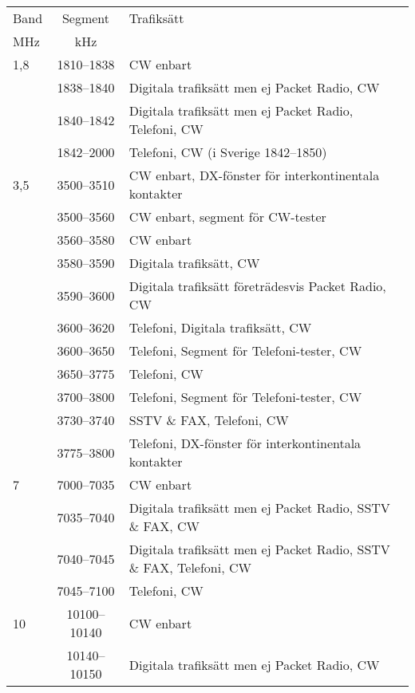 \setlongtables
\begin{longtable}{lcl}
Band & Segment & Trafiksätt \\
MHz  & kHz     & \\ \hline
\endhead

1,8  & 1810--1838 & CW enbart \\
     & 1838--1840 & Digitala trafiksätt men ej Packet Radio, CW \\
     & 1840--1842 & Digitala trafiksätt men ej Packet Radio, Telefoni, CW \\
     & 1842--2000 & Telefoni, CW (i Sverige 1842--1850) \\

3,5  & 3500--3510 & CW enbart, DX-fönster för interkontinentala kontakter \\
     & 3500--3560 & CW enbart, segment för CW-tester \\
     & 3560--3580 & CW enbart \\
     & 3580--3590 & Digitala trafiksätt, CW \\
     & 3590--3600 & Digitala trafiksätt företrädesvis Packet Radio, CW \\
     & 3600--3620 & Telefoni, Digitala trafiksätt, CW \\
     & 3600--3650 & Telefoni, Segment för Telefoni-tester, CW \\
     & 3650--3775 & Telefoni, CW \\
     & 3700--3800 & Telefoni, Segment för Telefoni-tester, CW \\
     & 3730--3740 & SSTV \& FAX, Telefoni, CW \\
     & 3775--3800 & Telefoni, DX-fönster för interkontinentala kontakter \\

7    & 7000--7035 & CW enbart \\
     & 7035--7040 & Digitala trafiksätt men ej Packet Radio, SSTV \& FAX, CW \\
     & 7040--7045 & Digitala trafiksätt men ej Packet Radio, SSTV \& FAX, Telefoni, CW \\
     & 7045--7100 & Telefoni, CW \\

10   & 10100--10140 & CW enbart \\
     & 10140--10150 & Digitala trafiksätt men ej Packet Radio, CW \\


\end{longtable}
